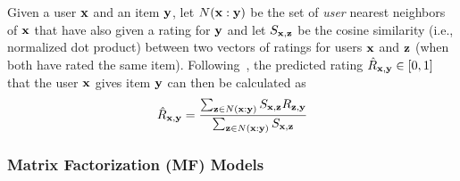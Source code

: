 Given a user $\mathbf{x}$ and an item $\mathbf{y}$, let $N(\mathbf{x}:\mathbf{y})$ be the set of
\emph{user} nearest neighbors of $\mathbf{x}$ that have also given a rating
for $\mathbf{y}$
and let $S_{\mathbf{x},\mathbf{z}}$ be the cosine similarity (i.e., normalized
dot product) between two vectors of ratings for users $\mathbf{x}$ and $\mathbf{z}$
(when both have rated the same item).  
Following~\cite{bellkor},
the predicted rating $\hat{R}_{\mathbf{x},\mathbf{y}} \in [0,1]$ that the user $\mathbf{x}$
gives item $\mathbf{y}$ can then be calculated as
\begin{equation}
\hat{R}_{\mathbf{x},\mathbf{y}} = \frac{\sum_{\mathbf{z} \in N(\mathbf{x}:\mathbf{y})} {S_{\mathbf{x},\mathbf{z}} R_{\mathbf{z},\mathbf{y}}} } {\sum_{\mathbf{z} \in N(\mathbf{x}:\mathbf{y})}{S_{\mathbf{x},\mathbf{z}}}}\end{equation}


\subsubsection{Matrix Factorization (MF) Models}
\label{sec:mf}

